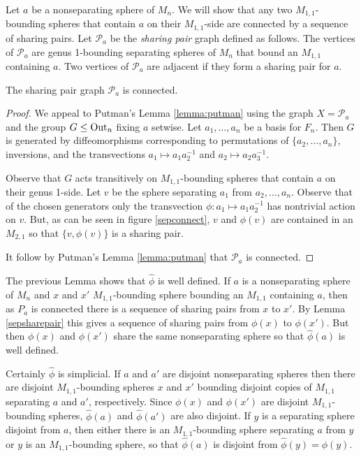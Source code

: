 Let $a$ be a nonseparating sphere of $M_n$.
We will show that any two $M_{1,1}$-bounding spheres
that contain $a$ on their $M_{1,1}$-side are connected by a sequence of
sharing pairs.
Let $\mathcal P_a$ be the \emph{sharing pair} graph defined as follows.
The vertices of $\mathcal P_a$
are genus 1-bounding separating spheres of $M_n$ that
bound an $M_{1,1}$ containing $a$.
Two vertices of $\mathcal P_a$ are adjacent
if they form a sharing pair for $a$.

\begin{lemma}
  \label{seppairgraph}
The sharing pair graph $\mathcal P_a$ is connected.
\end{lemma}

\begin{proof}
We appeal to Putman's Lemma \ref{lemma:putman}
using the graph $X=\mathcal P_a$ and the group
$G \leq \operatorname{Out}_{n}$ fixing $a$ setwise.
Let $a_1, \ldots, a_n$ be a basis for $F_n$.
Then $G$ is generated by
diffeomorphisms corresponding to
permutations of $\{a_2, \ldots, a_n\}$,
inversions, and the transvections
$a_1 \mapsto a_1a^{-1}_2$ and $a_2 \mapsto a_2a^{-1}_3$.

Observe that $G$ acts transitively on
$M_{1,1}$-bounding spheres
that contain $a$ on their genus 1-side.
Let $v$ be the sphere separating
$a_1$ from $a_2, \ldots, a_n$.
Observe that of the chosen generators only
the transvection $\phi: a_1 \mapsto a_1a^{-1}_2$
has nontrivial action on $v$.
But, as can be seen in figure \ref{sepconnect},
 $v$ and $\phi(v)$
 are contained in an $M_{2,1}$
 so that  $\{ v, \phi(v) \}$ is a sharing pair.

 It follow by Putman's Lemma \ref{lemma:putman} that $\mathcal P_a$ is connected.
\end{proof}

The previous Lemma shows that $\hat \phi$ is well defined.
If $a$ is a nonseparating sphere of $M_n$
and $x$ and $x'$ $M_{1,1}$-bounding sphere bounding an $M_{1,1}$ containing $a$,
then as $P_a$ is connected there is a sequence of sharing pairs from $x$ to $x'$.
By Lemma \ref{sepsharepair} this gives a sequence of
sharing pairs from $\phi(x)$ to $\phi(x')$.
But then $\phi(x)$ and $\phi(x')$ share the same nonseparating sphere
so that $\hat \phi (a)$ is well defined.

Certainly $\hat \phi$ is simplicial.
If $a$ and $a'$ are disjoint nonseparating spheres
then there are disjoint $M_{1,1}$-bounding spheres $x$ and $x'$ bounding
disjoint copies of $M_{1,1}$ separating $a$ and $a'$, respectively.
Since $\phi(x)$ and $\phi(x')$ are disjoint $M_{1,1}$-bounding spheres,
$\hat \phi(a)$ and $\hat \phi(a')$ are also disjoint.
If $y$ is a separating sphere disjoint from $a$, then
either there is an $M_{1,1}$-bounding sphere separating $a$ from $y$
or $y$ is an $M_{1,1}$-bounding sphere, so that $\hat \phi(a)$ is disjoint from $\hat \phi (y) = \phi(y)$.


